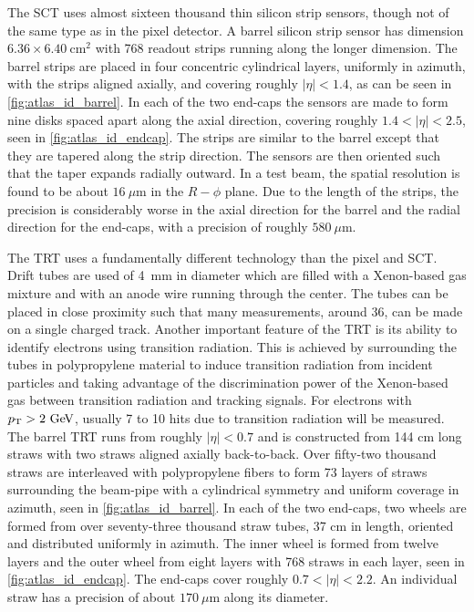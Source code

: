 The SCT uses almost sixteen thousand thin silicon strip sensors, though not of the 
same type as in the pixel detector. 
A barrel silicon strip sensor has dimension $6.36\times 6.40~\textrm{cm}^2$
with 768 readout strips running along the longer dimension. The barrel
strips are placed in four concentric cylindrical layers, uniformly in azimuth,
with the strips aligned axially, and covering roughly
$|\eta|<1.4$, as can be seen in \fig\ref{fig:atlas_id_barrel}.
In each of the two end-caps the sensors are made to form nine
disks spaced apart along the axial 
direction, covering roughly $1.4 < |\eta|<2.5$, 
seen in \fig\ref{fig:atlas_id_endcap}. The strips are similar
to the barrel except that they are tapered along the strip direction.
The sensors are then oriented such that the taper expands radially outward.
In a test beam, the spatial resolution is found to be about $16~\mu\textrm{m}$
in the $R-\phi$ plane. Due to the length of the strips, the precision is considerably
worse in the axial direction for the barrel and the radial direction for 
the end-caps, with a precision of roughly $580~\mu\textrm{m}$.


The TRT uses a fundamentally different technology 
than the pixel and SCT.
Drift tubes are used of 4~mm in diameter 
which are filled with a Xenon-based gas mixture
and with an anode wire running through the center.
The tubes can be placed in close
proximity such that many measurements, around 36,
can be made on a single charged track. Another important feature
of the TRT is its ability to identify electrons using transition radiation.
This is achieved by surrounding the tubes in polypropylene material to induce
transition radiation from incident particles and taking advantage
of the discrimination power of the Xenon-based gas between 
transition radiation and tracking signals.
For electrons with $\pt>2\GeV$, usually 7 to 10 hits due to transition
radiation will be measured.
The barrel TRT runs from roughly $|\eta|<0.7$ and
is constructed from 144 cm long straws with two straws aligned
axially back-to-back. Over fifty-two thousand straws are interleaved
with polypropylene fibers to form 73 layers of straws surrounding the beam-pipe with
a cylindrical symmetry and uniform coverage in azimuth,
seen in \fig\ref{fig:atlas_id_barrel}.
In each of the two end-caps, two wheels are formed from over seventy-three
thousand straw tubes, 37 cm in length, 
oriented and distributed uniformly in azimuth. 
The inner wheel is formed from twelve layers and the outer wheel from eight
layers with 768 straws in each layer, seen in \fig\ref{fig:atlas_id_endcap}.
The end-caps cover roughly $0.7<|\eta|<2.2$.
An individual straw has a precision of about $170~\mu\textrm{m}$ along
its diameter.




